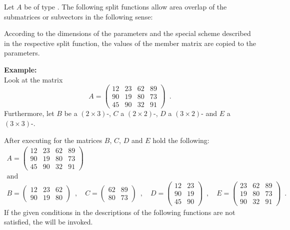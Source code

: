 
Let $A$ be of type .  The following split functions allow area overlap of
the submatrices or subvectors in the following sense:

According to the dimensions of the parameters and the special scheme described in the respective
split function, the values of the member matrix are copied to the parameters.

\textbf{Example:}\\
Look at the matrix
\begin{displaymath}
  A = \begin{pmatrix}
    12 & 23 & 62 & 89 \\
    90 & 19 & 80 & 73 \\
    45 & 90 & 32 & 91
  \end{pmatrix}\enspace.
\end{displaymath}
Furthermore, let $B$ be a $(2\times 3)$-, $C$ a $(2\times
2)$-, $D$ a $(3\times 2)$- and $E$ a $(3\times
3)$-.

After executing  for the matrices $B$, $C$, $D$ and $E$
hold the following:
\begin{displaymath}
  \begin{array}{c}
    A = \begin{pmatrix}
      12 & 23 & 62 & 89\\
      90 & 19 & 80 & 73\\
      45 & 90 & 32 & 91
    \end{pmatrix}\\
    \text{and}\\
    B = \begin{pmatrix}
      12 & 23 & 62 \\
      90 & 19 & 80
    \end{pmatrix}\enspace, \quad
    C = \begin{pmatrix}
      62 & 89\\
      80 & 73
    \end{pmatrix}\enspace, \quad
    D = \begin{pmatrix}
      12 & 23 \\
      90 & 19 \\
      45 & 90
    \end{pmatrix}\enspace, \quad
    E = \begin{pmatrix}
      23 & 62 & 89\\
      19 & 80 & 73\\
      90 & 32 & 91
    \end{pmatrix}\enspace.
  \end{array}
\end{displaymath}
If the given conditions in the descriptions of the following functions are not satisfied, the
\LEH will be invoked.


